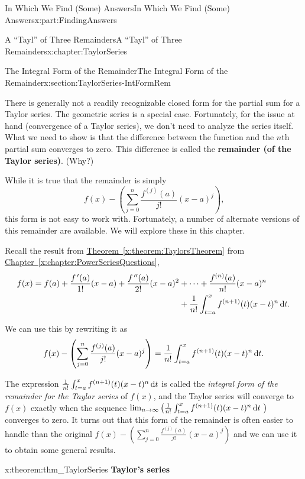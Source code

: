 \documentclass[oneside,10pt,]{book}
\newcommand{\xreffont}{\relax}
\newcommand{\terminology}[1]{\textbf{#1}}
\numberwithin{equation}{section}
\newcommand{\dx}[1]{\,{\rm d}#1}
\newcommand{\amp}{&}
\begin{document}
\begin{partptx}{In Which We Find (Some) Answers}{}{In Which We Find (Some) Answers}{}{}{x:part:FindingAnswers}
\begin{chapterptx}{A ``Tayl'' of Three Remainders}{}{A ``Tayl'' of Three Remainders}{}{}{x:chapter:TaylorSeries}
\begin{sectionptx}{The Integral Form of the Remainder}{}{The Integral Form of the Remainder}{}{}{x:section:TaylorSeries-IntFormRem}
\par
There is generally not a readily recognizable closed form for the partial sum for a Taylor series. The geometric series is a special case. Fortunately, for the issue at hand (convergence of a Taylor series), we don't need to analyze the series itself. What we need to show is that the difference between the function and the \(n\)th partial sum converges to zero. This difference is called the \terminology{remainder (of the Taylor series)}. (Why?)%
\par
While it is true that the remainder is simply%
\begin{equation*}
f(x)-\left(\sum_{j=0}^n\frac{f^{(j)}(a)}{j!}(x-a)^j\right)\text{,}
\end{equation*}
this form is not easy to work with. Fortunately, a number of alternate versions of this remainder are available. We will explore these in this chapter.%
\par
Recall the result from \hyperref[x:theorem:TaylorsTheorem]{Theorem~{\xreffont\ref{x:theorem:TaylorsTheorem}}} from \hyperref[x:chapter:PowerSeriesQuestions]{Chapter~{\xreffont\ref{x:chapter:PowerSeriesQuestions}}},%
\begin{align*}
f(x)=f(a)+\frac{f^{\,\prime}(a)}{1!}(x-a)+\frac{f^{\,\prime\prime}(a)}{2!}(x-a)^2\amp +\cdots+\frac{f^{(n)}(a)}{n!}(x-a)^n\\
\amp +\frac{1}{n!}\int_{t=a}^xf^{(n+1)}(t)(x-t)^n\dx{ t}\text{.}
\end{align*}
%
\par
We can use this by rewriting it as%
\begin{equation*}
f(x)-\left(\sum_{j=0}^n\frac{f^{(j)}(a)}{j!}(x-a)^j\right)=\frac{1}{n!}\int_{t=a}^xf^{(n+1)}(t)(x-t)^n\dx{ t}\text{.}
\end{equation*}
%
\par
The expression \(\frac{1}{n!}\int_{t=a}^xf^{(n+1)}(t)(x-t)^n\dx{ t}\) is called the \emph{integral form of the remainder for the Taylor series} of \(f(x)\), and the Taylor series will converge to \(f(x)\) exactly when the sequence \(\lim_{n\rightarrow\infty}\left(\frac{1}{n!}\int_{t=a}^xf^{(n+1)}(t)(x-t)^n\dx{ t}\text{ } \right)\) converges to zero. It turns out that this form of the remainder is often easier to handle than the original \(f(x)-\left(\sum_{j=0}^n\frac{f^{(j)}(a)}{j!}(x-a)^j\right)\) and we can use it to obtain some general results.%
\begin{theorem}{}{}{x:theorem:thm_TaylorSeries}%
\terminology{Taylor's series}%
\par

\end{theorem}
\end{sectionptx}
\end{chapterptx}
\end{partptx}
\end{document}
